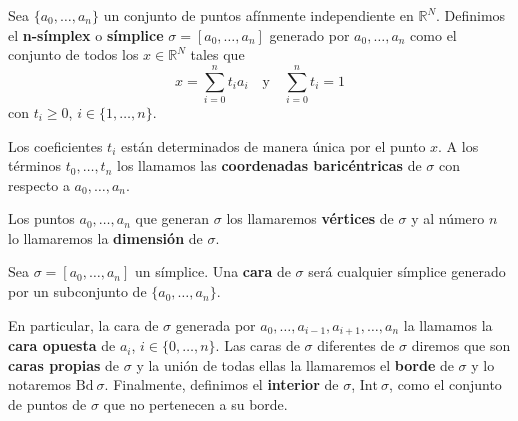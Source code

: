 \begin{definicion}
	Sea $\{a_0, \dots, a_n\}$ un conjunto de puntos afínmente independiente en 
	$\mathbb{R}^N$. Definimos el \textbf{n-símplex} o \textbf{símplice} $\sigma = [a_0, \dots, a_n]$ 
	generado por $a_0, 	\dots, a_n$ como el conjunto de todos los $x \in \mathbb{R}^N$ 
	tales que
	\[ x=\sum_{i=0}^{n}t_ia_i \quad \text{y} \quad \sum_{i=0}^{n}t_i=1 \]
	con $t_i \geq 0$, $i \in \{1, \dots, n\}$.
\end{definicion}
Los coeficientes $t_i$ están determinados de manera única por el punto $x$. A los términos  
$t_0, \dots, t_n$ los llamamos las \textbf{coordenadas baricéntricas} de $\sigma$
con respecto a $a_0, \dots, a_n$.

Los puntos $a_0, \dots, a_n$ que generan $\sigma$ los llamaremos \textbf{vértices} de $\sigma$
y al número $n$ lo llamaremos la \textbf{dimensión} de $\sigma$.

\begin{definicion}
	Sea $\sigma=[a_0, \dots, a_n]$ un símplice. Una \textbf{cara} de $\sigma$ será cualquier
	símplice generado por un subconjunto de $\{a_0, \dots, a_n\}$.
\end{definicion}
En particular, la cara de $\sigma$ generada por $a_0, \dots, a_{i-1}, a_{i+1}, \dots, a_n$ la 
llamamos la \textbf{cara opuesta} de $a_i$, $i \in \{0, \dots, n\}$. Las caras de $\sigma$ 
diferentes de $\sigma$ diremos que son \textbf{caras propias} de $\sigma$ y la unión de todas ellas la 
llamaremos el \textbf{borde} de $\sigma$ y lo notaremos $\text{Bd}\ \sigma$. Finalmente, definimos el \textbf{interior} de $\sigma$, $\text{Int}\ \sigma$, como el conjunto de puntos de $\sigma$ que no pertenecen 
a su borde.

